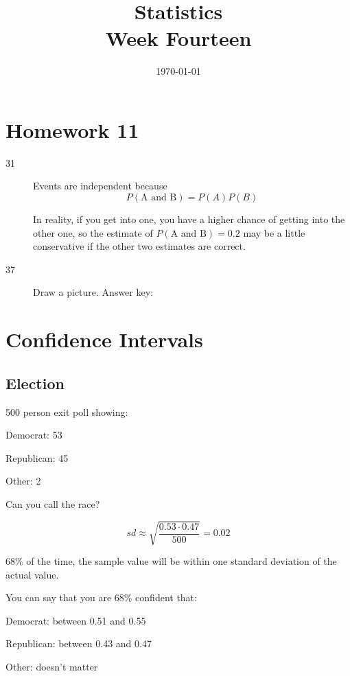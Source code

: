 \documentclass[landscape]{exam}
\title{Statistics \\ Week Fourteen}
\date{\today}
\author{}
\begin{document}
  \maketitle
  \tableofcontents

  \section{Homework 11}
  \begin{description}
    \item[31] Events are independent because
      \[
        P(\text{A and B}) = P(A) P(B)
      \]

      In reality, if you get into one, you have a higher chance of getting into
      the other one, so the estimate of $P(\text{A and B}) = 0.2$ may be a
      little conservative if the other two estimates are correct.


    \item[37] Draw a picture. Answer key:

  \end{description}
  \section{Confidence Intervals}

  \subsection{Election}

  500 person exit poll showing:
  \begin{itemize*}
    \item Democrat: 53
    \item Republican: 45
    \item Other: 2
  \end{itemize*}

  Can you call the race?

  \[
    sd \approx \sqrt{\frac{0.53 \cdot 0.47}{500}} = 0.02
  \]

  68\% of the time, the sample value will be within one standard deviation of
  the actual value. 
  
  You can say that you are 68\% confident that:
  \begin{itemize*}
    \item Democrat: between 0.51 and 0.55
    \item Republican: between 0.43 and 0.47
    \item Other: doesn't matter
  \end{itemize*}
\end{document}
